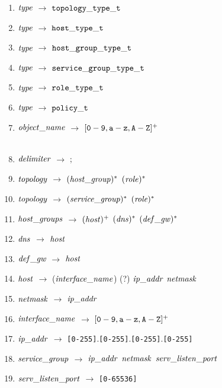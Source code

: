 \begin{enumerate}
\item \noindent ${\it type}$ $\rightarrow$ ${\tt topology\_type\_t}$ \\ 
\item ${\it type}$ $\rightarrow$ ${\tt host\_type\_t}$ \\ 
\item ${\it type}$ $\rightarrow$ ${\tt host\_group\_type\_t}$ \\ 
\item ${\it type}$ $\rightarrow$ ${\tt service\_group\_type\_t}$ \\ 
\item ${\it type}$ $\rightarrow$ ${\tt role\_type\_t}$ \\ 
\item ${\it type}$ $\rightarrow$ ${\tt policy\_t}$ \\ 
\item ${\it object\_name}$ $\rightarrow$ $[{\tt 0-9,a-z,A-Z}]^{+}$ \\\\ 

\item \noindent ${\it delimiter}$ $\rightarrow$ ${\tt;}$ \\ 

\item \noindent ${\it topology}$ $\rightarrow$ $({\it host\_group})^{*}$ $({\it role})^{*}$ \\ 
\item ${\it topology}$ $\rightarrow$ $({\it service\_group})^{*}$ $({\it role})^{*}$ \\ 
\item ${\it host\_groups}$ $\rightarrow$ $({\it host})^{+}$ $({\it dns})^{*}$ $({\it def\_gw})^{*}$ \\
\item ${\it dns}$ $\rightarrow$ ${\it host}$ \\ 
\item ${\it def\_gw}$ $\rightarrow$ ${\it host}$ \\ 
\item ${\it host}$ $\rightarrow$ (${\it interface\_name}$) (?) ${\it ip\_addr}$ ${\it netmask}$ \\ 
\item ${\it netmask}$ $\rightarrow$ ${\it ip\_addr}$ \\ 
\item ${\it interface\_name}$ $\rightarrow$ $[{\tt 0 - 9, a - z, A - Z}]^{+}$ \\ 
\item ${\it ip\_addr}$ $\rightarrow$ {\tt [0-255]}.{\tt [0-255]}.{\tt [0-255]}.{\tt [0-255]}\\
\item ${\it service\_group}$ $\rightarrow$ ${\it ip\_addr}$ ${\it netmask}$ ${\it serv\_listen\_port}$ \\ 
\item ${\it serv\_listen\_port}$ $\rightarrow$ {\tt [0-65536]}\\\\


\end{enumerate}
